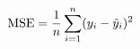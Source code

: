 \documentclass[preview]{standalone}
\begin{document}
\begin{align*}
\special{dvisvgm:raw <g id='unique000'>}\text{MSE} = \frac{1}{n}\sum_{i=1}^{n}(y_i - \hat{y}_i)^2\special{dvisvgm:raw </g>}
\end{align*}
\end{document}
